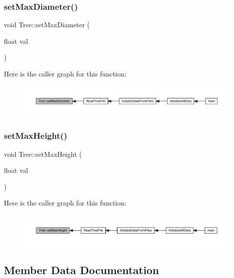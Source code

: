 \subsubsection{\texorpdfstring{set\+Max\+Diameter()}{setMaxDiameter()}}
{\footnotesize\ttfamily void Tree\+::set\+Max\+Diameter (\begin{DoxyParamCaption}\item[{float}]{val }\end{DoxyParamCaption})}

Here is the caller graph for this function\+:
\nopagebreak
\begin{figure}[H]
\begin{center}
\leavevmode
\includegraphics[width=350pt]{dd/df8/class_tree_a4073a7cc0b9b3388db7bff4491e96e72_icgraph}
\end{center}
\end{figure}
\mbox{\label{class_tree_afb29372db5251e9355aedd129e5d9a49}} 
\subsubsection{\texorpdfstring{set\+Max\+Height()}{setMaxHeight()}}
{\footnotesize\ttfamily void Tree\+::set\+Max\+Height (\begin{DoxyParamCaption}\item[{float}]{val }\end{DoxyParamCaption})}

Here is the caller graph for this function\+:
\nopagebreak
\begin{figure}[H]
\begin{center}
\leavevmode
\includegraphics[width=350pt]{dd/df8/class_tree_afb29372db5251e9355aedd129e5d9a49_icgraph}
\end{center}
\end{figure}


\subsection{Member Data Documentation}
\mbox{\label{class_tree_a078ecd006ec479cde84bf9e4f96219a8}} 
